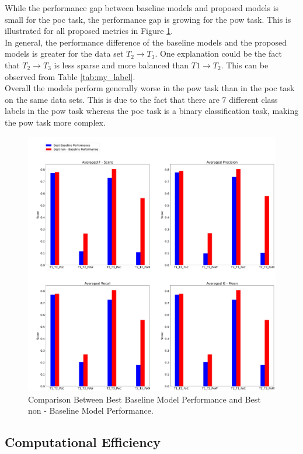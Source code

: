 While the performance gap between baseline models and proposed models is small for the \acrshort{poc} task, the performance gap is growing for the \acrshort{pow} task. This is illustrated for all proposed metrics in Figure \ref{fig:comparison}.\\
In general, the performance difference of the baseline models and the proposed models is greater for the data set $T_2 \to T_3$. One explanation could be the fact that $T_2 \to T_3$ is less sparse and more balanced than $T1 \to T_2$. This can be observed from Table \ref{tab:my_label}.\\
Overall the models perform generally worse in the \acrshort{pow} task than in the \acrshort{poc} task on the same data sets. This is due to the fact that there are 7 different class labels in the \acrshort{pow} task whereas the \acrshort{poc} task is a binary classification task, making the \acrshort{pow} task more complex.

\begin{figure}[!ht]
    \centering
    \includegraphics[width=1\textwidth]{images/comparison.jpg}
    \caption{Comparison Between Best Baseline Model Performance and Best non - Baseline Model Performance.}
    \label{fig:comparison}
\end{figure}

\subsection{Computational Efficiency}
\label{chap:efficiency}
